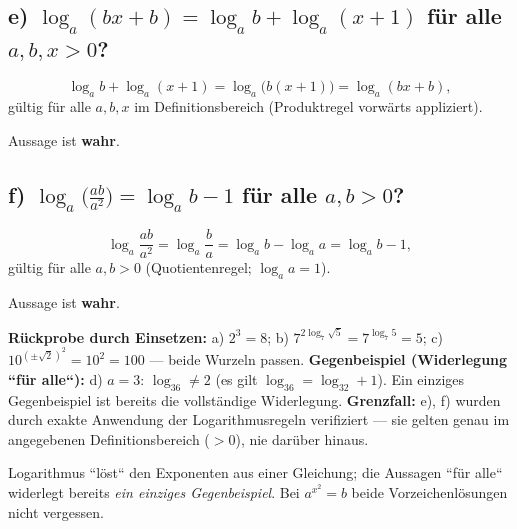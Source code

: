 \subsection*{e) $\log_a(bx+b)=\log_a b+\log_a(x+1)$ für alle $a,b,x>0$?}
\begin{equation}
  \log_a b+\log_a(x+1)=\log_a\bigl(b(x+1)\bigr)=\log_a(bx+b),
\end{equation}
gültig für alle $a,b,x$ im Definitionsbereich (Produktregel vorwärts
appliziert).
\begin{ergebnis} Aussage ist \textbf{wahr}. \end{ergebnis}

\subsection*{f) $\log_a\!\bigl(\tfrac{ab}{a^2}\bigr)=\log_a b-1$ für alle $a,b>0$?}
\begin{equation}
  \log_a\frac{ab}{a^2}=\log_a\frac{b}{a}=\log_a b-\log_a a=\log_a b-1 ,
\end{equation}
gültig für alle $a,b>0$ (Quotientenregel; $\log_a a=1$).
\begin{ergebnis} Aussage ist \textbf{wahr}. \end{ergebnis}

\begin{kontrolle}
\textbf{Rückprobe durch Einsetzen:} a) $2^3=8$; b)
$7^{2\log_7\sqrt5}=7^{\log_7 5}=5$; c) $10^{(\pm\sqrt2)^2}=10^2=100$
--- beide Wurzeln passen.
\textbf{Gegenbeispiel (Widerlegung ``für alle``):} d) $a=3$: $\log_36
\neq2$ (es gilt $\log_36=\log_32+1$). Ein einziges Gegenbeispiel ist
bereits die vollständige Widerlegung.
\textbf{Grenzfall:} e), f) wurden durch exakte Anwendung der
Logarithmusregeln verifiziert --- sie gelten genau im angegebenen
Definitionsbereich ($>0$), nie darüber hinaus.
\end{kontrolle}

\begin{merksatz}
Logarithmus ``löst`` den Exponenten aus einer Gleichung; die Aussagen
``für alle`` widerlegt bereits \emph{ein einziges Gegenbeispiel}. Bei
$a^{x^2}=b$ beide Vorzeichenlösungen nicht vergessen.
\end{merksatz}
